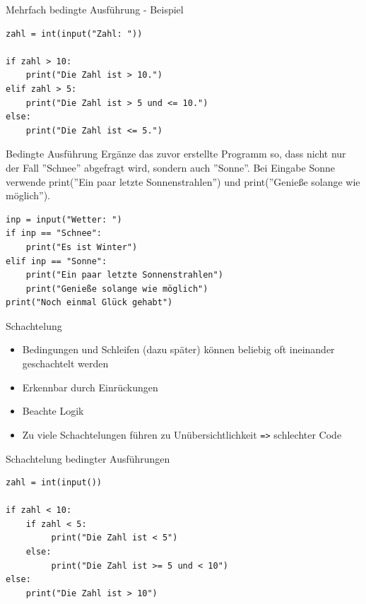 \begin{frame}[fragile]{Mehrfach bedingte Ausführung - Beispiel}
\begin{lstlisting}
zahl = int(input("Zahl: "))

if zahl > 10:
    print("Die Zahl ist > 10.")
elif zahl > 5:
    print("Die Zahl ist > 5 und <= 10.")
else:
    print("Die Zahl ist <= 5.")
\end{lstlisting}
\end{frame}


\begin{frame}[fragile]{Bedingte Ausführung}
Ergänze das zuvor erstellte Programm so, dass nicht nur der Fall ''Schnee'' abgefragt wird, sondern auch ''Sonne''. Bei Eingabe Sonne verwende print(''Ein paar letzte Sonnenstrahlen'') und  print(''Genieße solange wie möglich'').
\pause{}
\begin{lstlisting}
inp = input("Wetter: ")
if inp == "Schnee":
    print("Es ist Winter")
elif inp == "Sonne":
    print("Ein paar letzte Sonnenstrahlen")
    print("Genieße solange wie möglich")
print("Noch einmal Glück gehabt")
\end{lstlisting}
\end{frame} 


\begin{frame}[fragile]{Schachtelung}
\begin{itemize}
	\item Bedingungen und Schleifen (dazu später) können beliebig oft ineinander geschachtelt werden
	\item Erkennbar durch Einrückungen
	\item Beachte Logik
	\item Zu viele Schachtelungen führen zu Unübersichtlichkeit \texttt{=>} schlechter Code
\end{itemize}
\end{frame}


\begin{frame}[fragile]{Schachtelung bedingter Ausführungen}

\begin{lstlisting}
zahl = int(input())

if zahl < 10:
    if zahl < 5:
	     print("Die Zahl ist < 5")
	else:
		 print("Die Zahl ist >= 5 und < 10")
else:
	print("Die Zahl ist > 10")
\end{lstlisting}
\end{frame}


